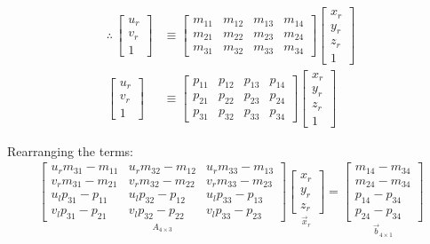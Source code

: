 \begin{align*}
    \therefore \,
    \begin{bmatrix}
        u_{r} \\
        v_{r} \\
        1
    \end{bmatrix}&\equiv\begin{bmatrix}
        m_{11} & m_{12} & m_{13} & m_{14} \\
        m_{21} & m_{22} & m_{23} & m_{24} \\
        m_{31} & m_{32} & m_{33} & m_{34}
    \end{bmatrix}\begin{bmatrix}
        x_{r} \\
        y_{r} \\
        z_{r} \\
        1
    \end{bmatrix}\\
    \begin{bmatrix}
        u_{r} \\
        v_{r} \\
        1
    \end{bmatrix}&\equiv\begin{bmatrix}
        p_{11} & p_{12} & p_{13} & p_{14} \\
        p_{21} & p_{22} & p_{23} & p_{24} \\
        p_{31} & p_{32} & p_{33} & p_{34}
    \end{bmatrix}\begin{bmatrix}
        x_{r} \\
        y_{r} \\
        z_{r} \\
        1
    \end{bmatrix}
\end{align*}

Rearranging the terms:
\begin{align*}
    \underset{A_{4\times3}}{\begin{bmatrix}
        u_{r} m_{31}-m_{11} & u_{r} m_{32}-m_{12} & u_{r} m_{33}-m_{13} \\
        v_{r} m_{31}-m_{21} & v_{r} m_{32}-m_{22} & v_{r} m_{33}-m_{23} \\
        u_{l} p_{31}-p_{11} & u_{l} p_{32}-p_{12} & u_{l} p_{33}-p_{13} \\
        v_{l} p_{31}-p_{21} & v_{l} p_{32}-p_{22} & v_{l} p_{33}-p_{23}
    \end{bmatrix}}
    \underset{\vec{x}_r}{\begin{bmatrix}
        x_{r} \\
        y_{r} \\
        z_{r}
    \end{bmatrix}}=
    \underset{\vec{b}_{4\times1}}{\begin{bmatrix}
        m_{14}-m_{34} \\
        m_{24}-m_{34} \\
        p_{14}-p_{34} \\
        p_{24}-p_{34}
    \end{bmatrix}}
\end{align*}

